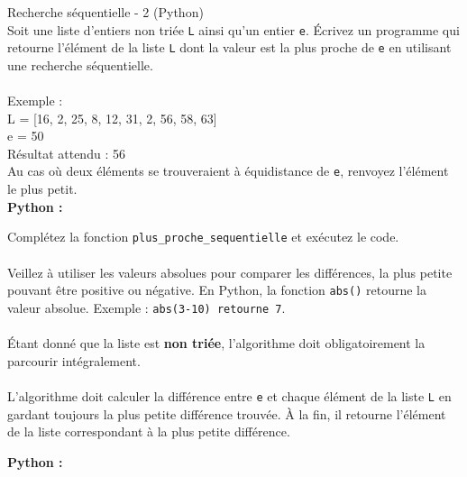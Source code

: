 \begin{Exercice}[10 minutes] Recherche séquentielle - 2 (Python)\\

Soit une liste d’entiers non triée \lstinline{L} ainsi qu’un entier \lstinline{e}. Écrivez un programme qui retourne l'élément de la liste \lstinline{L} dont la valeur est la plus proche de \lstinline{e} en utilisant une recherche séquentielle.\\\\
Exemple :\\
L = [16, 2, 25, 8, 12, 31, 2, 56, 58, 63]\\
e = 50\\
Résultat attendu : 56\\

Au cas où deux éléments se trouveraient à équidistance de \lstinline{e}, renvoyez l'élément le plus petit.\\

\textbf{Python :}
    
    \begin{conseil}
        Complétez la fonction \lstinline{plus_proche_sequentielle} et exécutez le code.\\\\
        Veillez à utiliser les valeurs absolues pour comparer les différences, la plus petite pouvant être positive ou négative. En Python, la fonction \lstinline{abs()} retourne la valeur absolue. Exemple : \lstinline{abs(3-10) retourne 7}.\\\\
        Étant donné que la liste est \textbf{non triée}, l'algorithme doit obligatoirement la parcourir intégralement.\\\\
        L'algorithme doit calculer la différence entre \lstinline{e} et chaque élément de la liste \lstinline{L} en gardant toujours la plus petite différence trouvée. À la fin, il retourne l'élément de la liste correspondant à la plus petite différence.  
    \end{conseil}
    
    \begin{solution}
    \textbf{Python :}
        
        
    \end{solution}
    
\end{Exercice}

